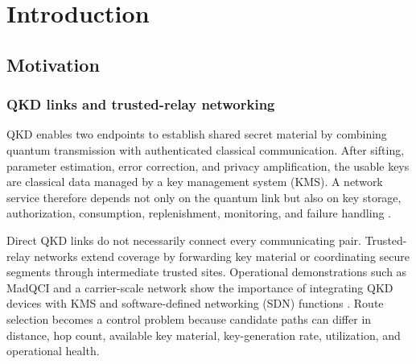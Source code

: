 \chapter{Introduction}
\label{chap:introduction}


\section{Motivation}

\subsection{QKD links and trusted-relay networking}

QKD enables two endpoints to establish shared secret material by combining quantum
transmission with authenticated classical communication. After sifting, parameter
estimation, error correction, and privacy amplification, the usable keys are
classical data managed by a key management system (KMS). A network service therefore
depends not only on the quantum link but also on key storage, authorization,
consumption, replenishment, monitoring, and failure handling
\cite{cao2022qinternet,mehic2020networking}.

Direct QKD links do not necessarily connect every communicating pair. Trusted-relay
networks extend coverage by forwarding key material or coordinating secure segments
through intermediate trusted sites. Operational demonstrations such as MadQCI and a
carrier-scale network show the importance of integrating QKD devices with KMS and
software-defined networking (SDN) functions
\cite{martin2024madqci,chen2025carrier}. Route selection becomes a control problem
because candidate paths can differ in distance, hop count, available key material,
key-generation rate, utilization, and operational health.


